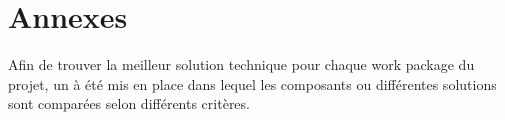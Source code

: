 \section{Annexes}

Afin de trouver la meilleur solution technique pour chaque work package du projet, un  à été mis en place dans lequel les composants ou différentes solutions sont comparées selon différents critères.


